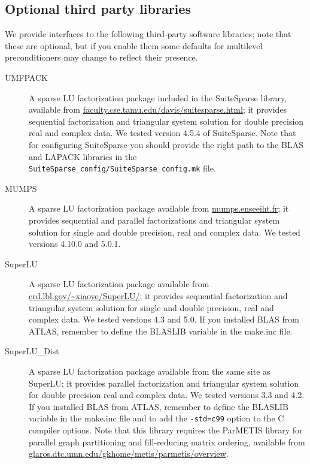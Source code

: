 \subsection{Optional third party libraries\label{sec:third-party}}

We provide interfaces to the following third-party software libraries;
note that these are optional, but if you enable them some defaults
for multilevel preconditioners may change to reflect their presence.

\begin{description}
\item[UMFPACK] \cite{UMFPACK}
  A sparse LU factorization package included in the SuiteSparse library, available from
  \url{faculty.cse.tamu.edu/davis/suitesparse.html};
  it provides sequential factorization and triangular system solution for double
  precision real and complex data. We tested version 4.5.4 of SuiteSparse.
  Note that for configuring SuiteSparse you should provide the right path to the BLAS
  and LAPACK libraries in the \verb|SuiteSparse_config/SuiteSparse_config.mk| file.
\item[MUMPS] \cite{MUMPS}
  A sparse LU factorization package available from \url{mumps.enseeiht.fr};
  it provides sequential and parallel factorizations and triangular system solution
  for single and double precision, real and complex data.
  We tested versions 4.10.0 and 5.0.1.
\item[SuperLU] \cite{SUPERLU}
  A sparse LU factorization package available from
  \url{crd.lbl.gov/~xiaoye/SuperLU/}; it provides sequential
  factorization and triangular system solution for single and double precision,
  real and complex data. We tested versions 4.3 and 5.0. If you installed BLAS from
  ATLAS, remember to define the BLASLIB variable in the make.inc file.
 \item[SuperLU\_Dist] \cite{SUPERLUDIST}
   A sparse LU factorization package available
   from the same site as SuperLU; it provides parallel factorization and
   triangular system solution for double precision real and complex data.
   We tested versions 3.3 and 4.2. If you installed BLAS from
   ATLAS, remember to define the BLASLIB variable in the make.inc file and
   to add the \verb|-std=c99| option to the C compiler options.
   Note that this library requires the ParMETIS
   library for parallel graph partitioning and fill-reducing matrix ordering, available from
   \url{glaros.dtc.umn.edu/gkhome/metis/parmetis/overview}.
\end{description}

